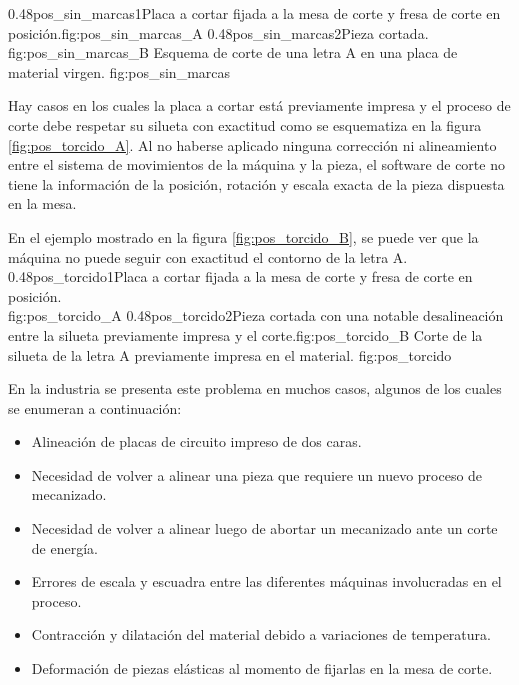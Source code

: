 \subfigab
         {0.48}{pos_sin_marcas1}{Placa a cortar fijada a la mesa de corte y fresa de corte en posición.}{fig:pos_sin_marcas_A}
         {0.48}{pos_sin_marcas2}{Pieza cortada.\\ \hphantom{1}}{fig:pos_sin_marcas_B}
         {Esquema de corte de una letra A en una placa de material virgen.}
         {fig:pos_sin_marcas}

         Hay casos en los cuales la placa a cortar está previamente impresa y el proceso de corte debe respetar su silueta con exactitud como se esquematiza en la figura \ref{fig:pos_torcido_A}.
         Al no haberse aplicado ninguna corrección ni alineamiento entre el sistema de movimientos de la máquina y la pieza, el software de corte no tiene la información de la posición, rotación y escala exacta de la pieza dispuesta en la mesa. \par
         En el ejemplo mostrado en la figura \ref{fig:pos_torcido_B}, se puede ver que la máquina no puede seguir con exactitud el contorno de la letra A.\\

\subfigab
         {0.48}{pos_torcido1}{Placa a cortar fijada a la mesa de corte y fresa de corte en posición.\\ \vphantom{1}}{fig:pos_torcido_A}
         {0.48}{pos_torcido2}{Pieza cortada con una notable desalineación entre la silueta previamente impresa y el corte.}{fig:pos_torcido_B}
         {Corte de la silueta de la letra A previamente impresa en el material.}
         {fig:pos_torcido}

         En la industria se presenta este problema en muchos casos, algunos de los cuales se enumeran a continuación:
\begin{itemize}
   \item{Alineación de placas de circuito impreso de dos caras.}
   \item{Necesidad de volver a alinear una pieza que requiere un nuevo proceso de mecanizado.}
   \item{Necesidad de volver a alinear luego de abortar un mecanizado ante un corte de energía.}
   \item{Errores de escala y escuadra entre las diferentes máquinas involucradas en el proceso.}
   \item{Contracción y dilatación del material debido a variaciones de temperatura.}
   \item{Deformación de piezas elásticas al momento de fijarlas en la mesa de corte.}
\end{itemize}

